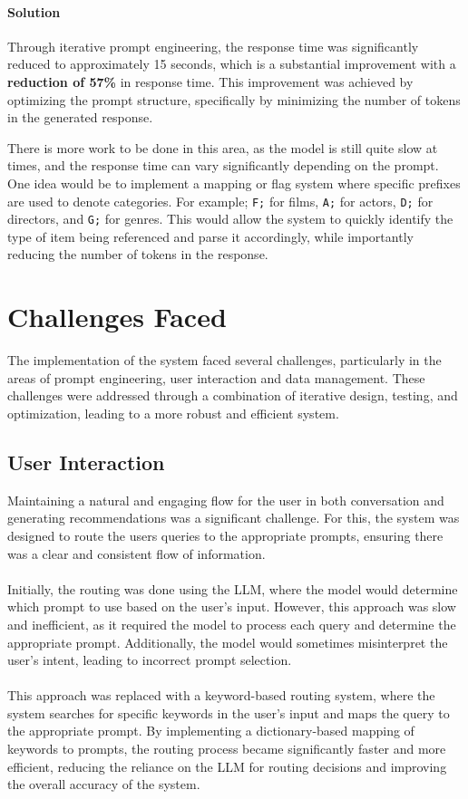 \paragraph{Solution}Through iterative prompt engineering, the response time was significantly reduced to approximately 15 seconds, which is a substantial improvement with a \textbf{reduction of 57\%} in response time.
This improvement was achieved by optimizing the prompt structure, specifically by minimizing the number of tokens in the generated response.

There is more work to be done in this area, as the model is still quite slow at times, and the response time can vary significantly depending on the prompt.
One idea would be to implement a mapping or flag system where specific prefixes are used to denote categories. For example; \texttt{F;} for films, \texttt{A;} for actors, \texttt{D;} for directors, and \texttt{G;} for genres.
This would allow the system to quickly identify the type of item being referenced and parse it accordingly, while importantly reducing the number of tokens in the response.


\section{Challenges Faced}
\label{sec:challenges_faced}
The implementation of the system faced several challenges, particularly in the areas of prompt engineering, user interaction and data management.
These challenges were addressed through a combination of iterative design, testing, and optimization, leading to a more robust and efficient system.

\subsection{User Interaction}
\label{subsec:user_interaction_challenges}
Maintaining a natural and engaging flow for the user in both conversation and generating recommendations was a significant challenge.
For this, the system was designed to route the users queries to the appropriate prompts, ensuring there was a clear and consistent flow of information.
\\\\
Initially, the routing was done using the LLM, where the model would determine which prompt to use based on the user's input.
However, this approach was slow and inefficient, as it required the model to process each query and determine the appropriate prompt.
Additionally, the model would sometimes misinterpret the user's intent, leading to incorrect prompt selection.
\\\\
This approach was replaced with a keyword-based routing system, where the system searches for specific keywords in the user's input and maps the query to the appropriate prompt. By implementing a dictionary-based mapping of keywords to prompts, the routing process became significantly faster and more efficient, reducing the reliance on the LLM for routing decisions and improving the overall accuracy of the system.



